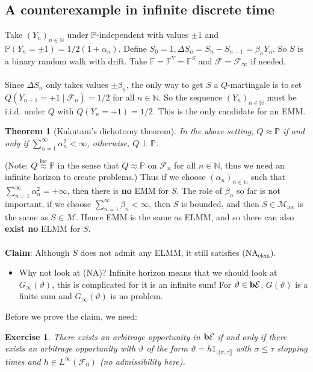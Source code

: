 \documentclass[12pt,a4paper, twoside]{article}
\newtheorem{thm}{Theorem}[section]
\newtheorem{exe}{Exercise}[section]
\theoremstyle{definition}
\newcommand{\PP}{\mathbb{P}} %
\newcommand{\simple}{\textbf{\text{b}}\mathcal{E}}
\begin{document}
\subsection{A counterexample in infinite discrete time}
Take $(Y_n)_{n \in \mathbb{N}}$ under $\PP$-independent with values $\pm 1$ and $\PP(Y_n= \pm 1)= 1/2(1+ \alpha_n)$. Define $S_0=1, \Delta S_n= S_n-S_{n-1}= \beta_n Y_n$. So $S$ is a binary random walk with drift. Take $\mathbb{F}= \mathbb{F}^Y= \mathbb{F}^S$ and $\mathcal{F}= \mathcal{F}_\infty$ if needed. \\
\\
Since $\Delta S_n$ only takes values $\pm \beta_n$, the only way to get $S$ a $Q$-martingale is to set $Q(Y_{n+1}= +1 \mid \mathcal{F}_n)= 1/2$ for all $n \in \mathbb{N}$. So the sequence $(Y_n)_{n \in \mathbb{N}}$ must be i.i.d. under $Q$ with $Q(Y_n=+1)=1/2$. This is the only candidate for an EMM. 
\begin{thm}[Kakutani's dichotomy theorem] In the above setting, $Q \approx \PP$ if and only if $\sum_{n=1}^\infty \alpha_n^2 < \infty$, otherwise, $Q \perp \PP$. 
\end{thm}
(Note: $Q \overset{\text{loc}}\approx \PP$ in the sense that $Q \approx \PP$ on $\mathcal{F}_n$ for all $n \in \mathbb{N}$, thus we need an infinite horizon to create problems.)
\newpage
Thus if we choose $(\alpha_n)_{n \in \mathbb{N}}$ such that $\sum_{n=1}^\infty \alpha_n^2 = + \infty$, then there is \textbf{no} EMM for $S$. The role of $\beta_n$ so far is not important, if we choose $\sum_{n=1}^\infty \beta_n < \infty$, then $S$ is bounded, and then $S \in \mathcal{M}_{\text{loc}}$ is the same as $S \in \mathcal{M}$. Hence EMM is the same as ELMM, and so there can also \textbf{exist no} ELMM for $S$. \\
\\
\textbf{Claim}: Although $S$ does not admit any ELMM, it still satisfies (NA$_\text{elem}$). 
\begin{itemize}
\item Why not look at (NA)? Infinite horizon means that we should look at $G_\infty ( \vartheta)$, this is complicated for it is an infinite sum! For $\vartheta \in \simple$, $G( \vartheta)$ is a finite sum and $G_\infty( \vartheta)$ is no problem. 
\end{itemize}
Before we prove the claim, we need:
\begin{exe} \label{ex3} There exists an arbitrage opportunity in $\simple$ if and only if there exists an arbitrage opportunity with $\vartheta$ of the form $\vartheta = h 1_{(\!(\sigma, \tau ]\!]}$ with $\sigma \leq \tau$ stopping times and $h \in L^\infty ( \mathcal{F}_0)$ (no admissibility here). 
\end{exe}
\end{document}
